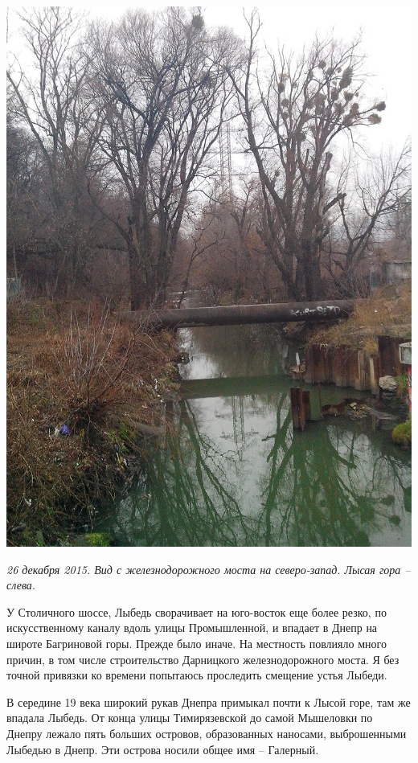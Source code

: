 \begin{center}
\includegraphics[width=\textwidth]{chast-lys-gory/zazver/IMG_20151226_150617.jpg}

\textit{26 декабря 2015. Вид с железнодорожного моста на северо-запад. Лысая гора – слева.}
\end{center}

У Столичного шоссе, Лыбедь сворачивает на юго-восток еще более резко, по искусственному каналу вдоль улицы Промышленной, и впадает в Днепр на широте Багриновой горы. Прежде было иначе. На местность повлияло много причин, в том числе строительство Дарницкого железнодорожного моста. Я без точной привязки ко времени попытаюсь проследить смещение устья Лыбеди.

В середине 19 века широкий рукав Днепра примыкал почти к Лысой горе, там же впадала Лыбедь. От конца улицы Тимирязевской до самой Мышеловки по Днепру лежало пять больших островов, образованных наносами, выброшенными Лыбедью в Днепр. Эти острова носили общее имя – Галерный.

